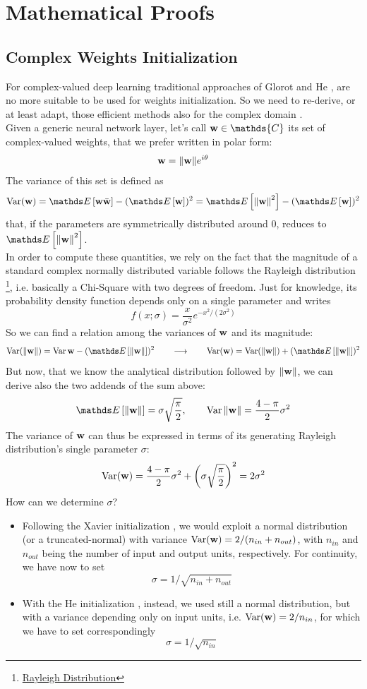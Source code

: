 \documentclass[../main.tex]{subfiles}
\begin{document}
	
\chapter{Mathematical Proofs}
\label{app:cmplx_optim}


\section{Complex Weights Initialization}
\label{app:weight_init}

For complex-valued deep learning traditional approaches of Glorot \cite{xavier_init} and He \cite{he2015delving}, are no more suitable to be used for weights initialization. So we need to re-derive, or at least adapt, those efficient methods also for the complex domain \cite{trabelsi2018deep}.\\
Given a generic neural network layer, let's call $\vb{w}\in\mathds{C}$ its set of complex-valued weights, that we prefer written in polar form:
\[ \vb{w} = \norm{\vb{w}}e^{i\theta} \]
The variance of this set is defined as 
\[ \Var(\vb{w}) = \Ev{\vb{w}\bar{\vb{w}}} - (\Ev{\vb{w}})^2 = \Ev{\norm{\vb{w}}^2} - (\Ev{\vb{w}})^2 \]
that, if the parameters are symmetrically distributed around 0, reduces to $\Ev{\norm{\vb{w}}^2}$.\\
In order to compute these quantities, we rely on the fact that the magnitude of a standard complex normally distributed variable follows the Rayleigh distribution \footnote{\href{https://en.wikipedia.org/wiki/Rayleigh\_distribution}{Rayleigh Distribution}}, i.e. basically a Chi-Square with two degrees of freedom. Just for knowledge, its probability density function depends only on a single parameter and writes
\[ f(x; \sigma) = \frac{x}{\sigma^2}e^{-x^2 / (2\sigma^2)} \]
So we can find a relation among the variances of $\vb{w}$ and its magnitude:
\[ \Var(\norm{\vb{w}}) = \Var{\vb{w}} - (\Ev{\norm{\vb{w}}})^2 \qquad\longrightarrow\qquad \Var({\vb{w}}) = \Var(\norm{\vb{w}}) + (\Ev{\norm{\vb{w}}})^2 \]
But now, that we know the analytical distribution followed by $\norm{\vb{w}}$, we can derive also the two addends of the sum above:
\[ \Ev{\norm{\vb{w}}} = \sigma\sqrt{\frac{\pi}{2}}, \qquad \Var{\norm{\vb{w}}} = \frac{4-\pi}{2}\sigma^2 \]
The variance of $\vb{w}$ can thus be expressed in terms of its generating Rayleigh distribution's single parameter $\sigma$:
\[ \operatorname{Var}(\vb{w}) = \frac{4-\pi}{2}\sigma^2 + \left(\sigma\sqrt{\frac{\pi}{2}}\right)^2 = 2\sigma^2 \]
How can we determine $\sigma$?\\
\begin{itemize}
	\item Following the Xavier initialization \cite{xavier_init}, we would exploit a normal distribution (or a truncated-normal) with variance $\operatorname{Var}(\vb{w}) = 2 / (n_{in} + n_{out})$, with $n_{in}$ and $n_{out}$ being the number of input and output units, respectively. For continuity, we have now to set
	\[ \sigma = 1 / \sqrt{n_{in} + n_{out}} \]
	\item With the He initialization \cite{he2015delving}, instead, we used still a normal distribution, but with a variance depending only on input units, i.e. $\operatorname{Var}(\vb{w}) = 2/n_{in}$, for which we have to set correspondingly
	\[ \sigma = 1 / \sqrt{n_{in}} \]
\end{itemize}
\end{document}
